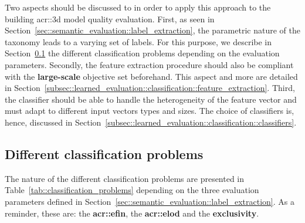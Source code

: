     Two aspects should be discussed to in order to apply this approach to the building \gls{acr::3d} model quality evaluation.
    First, as seen in Section~\ref{sec::semantic_evaluation::label_extraction}, the parametric nature of the taxonomy leads to a varying set of labels.
    For this purpose, we describe in Section~\ref{subsec::learned_evaluation::classification::different_porblems} the different classification problems depending on the evaluation parameters.
    Secondly, the feature extraction procedure should also be compliant with the \textbf{large-scale} objective set beforehand.
    This aspect and more are detailed in Section~\ref{subsec::learned_evaluation::classification::feature_extraction}.
    Third, the classifier should be able to handle the heterogeneity of the feature vector and must adapt to different input vectors types and sizes.
    The choice of classifiers is, hence, discussed in Section~\ref{subsec::learned_evaluation::classification::classifiers}.

    \subsection{Different classification problems}
        \label{subsec::learned_evaluation::classification::different_porblems}
        The nature of the different classification problems are presented in Table~\ref{tab::classification_problems} depending on the three evaluation parameters defined in Section~\ref{sec::semantic_evaluation::label_extraction}.
        As a reminder, these are: the \textbf{\gls{acr::efin}}, the \textbf{\gls{acr::elod}} and the \textbf{exclusivity}.\\

